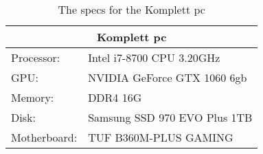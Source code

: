 \begin{table}[h]
    \begin{tabular}{ll}
    \hline
    \multicolumn{2}{|c|}{Komplett pc}           \\ \hline
    Processor:   & Intel i7-8700 CPU 3.20GHz    \\
    GPU:         & NVIDIA GeForce GTX 1060 6gb  \\
    Memory:      & DDR4 16G                     \\
    Disk:        & Samsung SSD 970 EVO Plus 1TB \\
    Motherboard: & TUF B360M-PLUS GAMING       
    \end{tabular}
    \caption{The specs for the Komplett pc}
    \label{tab:komplett}
\end{table}